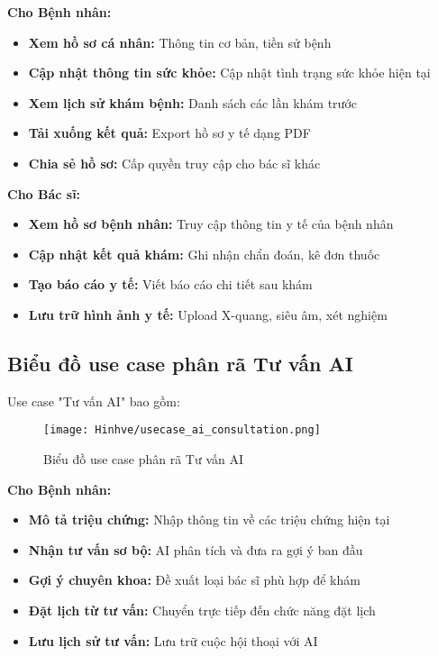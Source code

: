 \documentclass[../DoAn.tex]{subfiles}
\begin{document}
\textbf{Cho Bệnh nhân:}
\begin{itemize}
    \item \textbf{Xem hồ sơ cá nhân:} Thông tin cơ bản, tiền sử bệnh
    \item \textbf{Cập nhật thông tin sức khỏe:} Cập nhật tình trạng sức khỏe hiện tại
    \item \textbf{Xem lịch sử khám bệnh:} Danh sách các lần khám trước
    \item \textbf{Tải xuống kết quả:} Export hồ sơ y tế dạng PDF
    \item \textbf{Chia sẻ hồ sơ:} Cấp quyền truy cập cho bác sĩ khác
\end{itemize}

\textbf{Cho Bác sĩ:}
\begin{itemize}
    \item \textbf{Xem hồ sơ bệnh nhân:} Truy cập thông tin y tế của bệnh nhân
    \item \textbf{Cập nhật kết quả khám:} Ghi nhận chẩn đoán, kê đơn thuốc
    \item \textbf{Tạo báo cáo y tế:} Viết báo cáo chi tiết sau khám
    \item \textbf{Lưu trữ hình ảnh y tế:} Upload X-quang, siêu âm, xét nghiệm
\end{itemize}

\subsection{Biểu đồ use case phân rã Tư vấn AI}
\label{subsection:2.2.5}

Use case "Tư vấn AI" bao gồm:

\begin{figure}[H]
    \centering
    \texttt{[image: Hinhve/usecase\_ai\_consultation.png]}
    \caption{Biểu đồ use case phân rã Tư vấn AI}
    \label{fig:usecase_ai_consultation}
\end{figure}

\textbf{Cho Bệnh nhân:}
\begin{itemize}
    \item \textbf{Mô tả triệu chứng:} Nhập thông tin về các triệu chứng hiện tại
    \item \textbf{Nhận tư vấn sơ bộ:} AI phân tích và đưa ra gợi ý ban đầu
    \item \textbf{Gợi ý chuyên khoa:} Đề xuất loại bác sĩ phù hợp để khám
    \item \textbf{Đặt lịch từ tư vấn:} Chuyển trực tiếp đến chức năng đặt lịch
    \item \textbf{Lưu lịch sử tư vấn:} Lưu trữ cuộc hội thoại với AI
\end{itemize}
\end{document}
